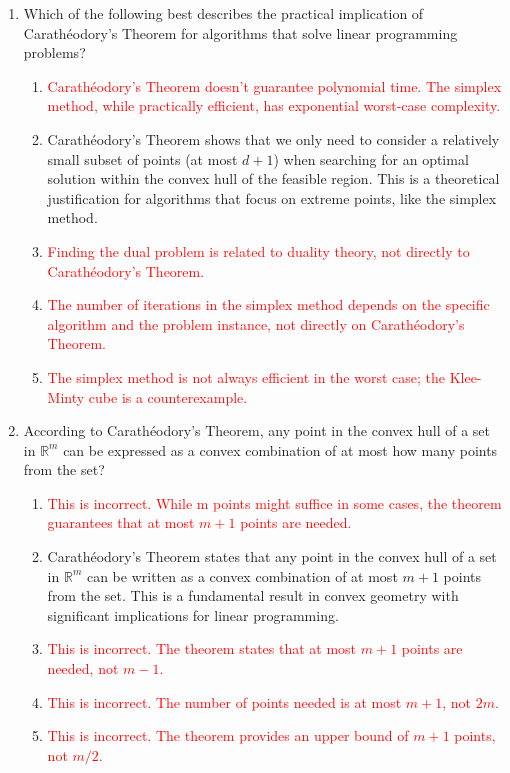 \documentclass{article}%
\newcommand{\incorrect}[1]{\textcolor{red}{#1}}
\begin{document}
\begin{enumerate}
\begin{enumerate}
\end{enumerate}%
\vspace{1em}%
\item Which of the following best describes the practical implication of Carathéodory's Theorem for algorithms that solve linear programming problems?%
\begin{enumerate}%
\item \incorrect{Carathéodory's Theorem doesn't guarantee polynomial time. The simplex method, while practically efficient, has exponential worst-case complexity.}%
\item Carathéodory's Theorem shows that we only need to consider a relatively small subset of points (at most $d+1$) when searching for an optimal solution within the convex hull of the feasible region. This is a theoretical justification for algorithms that focus on extreme points, like the simplex method.%
\item \incorrect{Finding the dual problem is related to duality theory, not directly to Carathéodory's Theorem.}%
\item \incorrect{The number of iterations in the simplex method depends on the specific algorithm and the problem instance, not directly on Carathéodory's Theorem.}%
\item \incorrect{The simplex method is not always efficient in the worst case; the Klee-Minty cube is a counterexample.}%
\end{enumerate}%
\vspace{1em}%
\item According to Carathéodory's Theorem, any point in the convex hull of a set in $\mathbb{R}^m$ can be expressed as a convex combination of at most how many points from the set?%
\begin{enumerate}%
\item \incorrect{This is incorrect. While m points might suffice in some cases, the theorem guarantees that at most $m+1$ points are needed.}%
\item Carathéodory's Theorem states that any point in the convex hull of a set in $\mathbb{R}^m$ can be written as a convex combination of at most $m+1$ points from the set.  This is a fundamental result in convex geometry with significant implications for linear programming.%
\item \incorrect{This is incorrect. The theorem states that at most $m+1$ points are needed, not $m-1$.}%
\item \incorrect{This is incorrect. The number of points needed is at most $m+1$, not $2m$.}%
\item \incorrect{This is incorrect. The theorem provides an upper bound of $m+1$ points, not $m/2$.}%
\end{enumerate}%
\vspace{1em}%
\end{enumerate}

%
\end{document}
